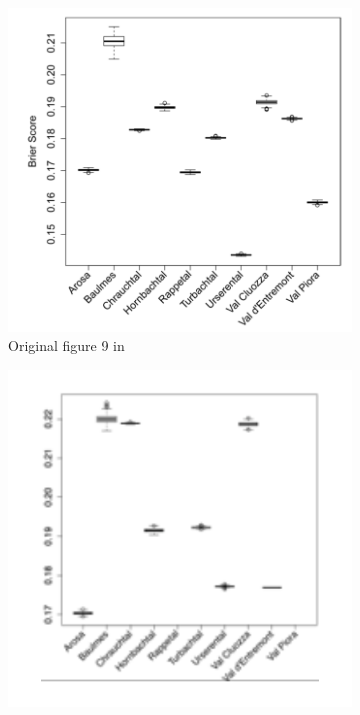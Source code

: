 \documentclass[twoside,twocolumn]{article}
\begin{document}
\begin{figure}
    \centering
    \begin{subfigure}{.33\textwidth}
      \centering
      \includegraphics[width=\linewidth]{orig_brier_score}
      \caption{Original figure 9 in \cite{zweifel_samarin_meusburger_alewell_2021}}
      \label{fig:bug_fix:1}
    \end{subfigure}%
    \begin{subfigure}{.33\textwidth}
      \centering
      \includegraphics[width=\linewidth]{repr_brierscore_with_bug}

\end{subfigure}
\end{figure}
\end{document}

